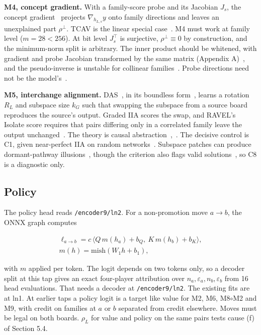 \documentclass[conference]{IEEEtran}
\begin{document}
\textbf{M4, concept gradient.} With a family-score probe and its Jacobian $J_s$, the concept gradient~\cite{bai2023} projects $\nabla_{h_{L,s}}y$ onto family directions and leaves an unexplained part $\rho^\perp$. TCAV is the linear special case~\cite{kim2018}. M4 must work at family level ($m=28<256$). At bit level $J_s^\top$ is surjective, $\rho^\perp\equiv0$ by construction, and the minimum-norm split is arbitrary. The inner product should be whitened, with gradient and probe Jacobian transformed by the same matrix (Appendix A)~\cite{park2024}, and the pseudo-inverse is unstable for collinear families~\cite{nicolson2025}. Probe directions need not be the model's~\cite{tucker2021}.

\textbf{M5, interchange alignment.} DAS~\cite{geiger2024}, in its boundless form~\cite{wu2023}, learns a rotation $R_L$ and subspace size $k_G$ such that swapping the subspace from a source board reproduces the source's output. Graded IIA scores the swap, and RAVEL's Isolate score requires that pairs differing only in a correlated family leave the output unchanged~\cite{huang2024}. The theory is causal abstraction~\cite{geiger2021},~\cite{geiger2025}. The decisive control is C1, given near-perfect IIA on random networks~\cite{sutter2025}. Subspace patches can produce dormant-pathway illusions~\cite{makelov2024}, though the criterion also flags valid solutions~\cite{wu2024}, so C8 is a diagnostic only.

\subsection{Policy}\label{sec:7.4}
The policy head reads \texttt{/\allowbreak{}encoder9/\allowbreak{}ln2}. For a non-promotion move $a\to b$, the ONNX graph computes

\[
\begin{gathered}\ell_{a\to b}=c\,\big\langle Q\,m(h_a)+b_Q,\ K\,m(h_b)+b_K\big\rangle,\\
m(h)=\mathrm{mish}(W_1h+b_1),\end{gathered}
\]

with $m$ applied per token. The logit depends on two tokens only, so a decoder split at this tap gives an exact four-player attribution over $n_a,\varepsilon_a,n_b,\varepsilon_b$ from 16 head evaluations. That needs a decoder at \texttt{/\allowbreak{}encoder9/\allowbreak{}ln2}. The existing fits are at ln1. At earlier taps a policy logit is a target like value for M2, M6, M8$\circ$M2 and M9, with credit on families at $a$ or $b$ separated from credit elsewhere. Moves must be legal on both boards. $\rho_L$ for value and policy on the same pairs tests cause (f) of Section 5.4.
\end{document}
